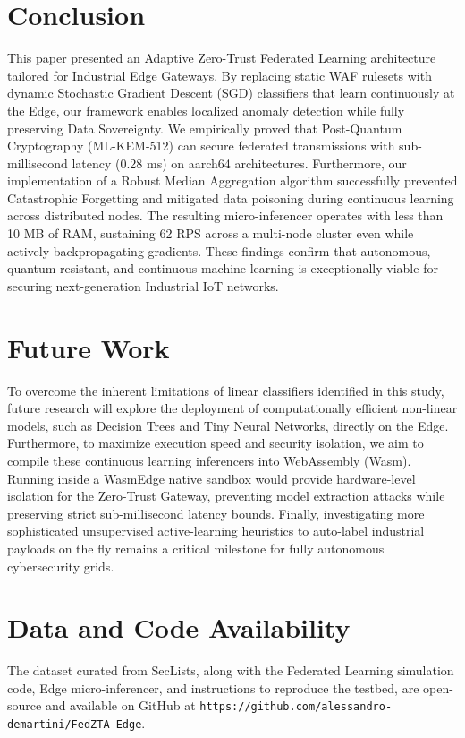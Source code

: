 \documentclass[conference]{IEEEtran}
\begin{document}
\section{Conclusion}
This paper presented an Adaptive Zero-Trust Federated Learning architecture tailored for Industrial Edge Gateways. By replacing static WAF rulesets with dynamic Stochastic Gradient Descent (SGD) classifiers that learn continuously at the Edge, our framework enables localized anomaly detection while fully preserving Data Sovereignty. We empirically proved that Post-Quantum Cryptography (ML-KEM-512) can secure federated transmissions with sub-millisecond latency (0.28 ms) on aarch64 architectures. Furthermore, our implementation of a Robust Median Aggregation algorithm successfully prevented Catastrophic Forgetting and mitigated data poisoning during continuous learning across distributed nodes. The resulting micro-inferencer operates with less than 10 MB of RAM, sustaining 62 RPS across a multi-node cluster even while actively backpropagating gradients. These findings confirm that autonomous, quantum-resistant, and continuous machine learning is exceptionally viable for securing next-generation Industrial IoT networks.

\section{Future Work}
To overcome the inherent limitations of linear classifiers identified in this study, future research will explore the deployment of computationally efficient non-linear models, such as Decision Trees and Tiny Neural Networks, directly on the Edge. Furthermore, to maximize execution speed and security isolation, we aim to compile these continuous learning inferencers into WebAssembly (Wasm). Running inside a WasmEdge native sandbox would provide hardware-level isolation for the Zero-Trust Gateway, preventing model extraction attacks while preserving strict sub-millisecond latency bounds. Finally, investigating more sophisticated unsupervised active-learning heuristics to auto-label industrial payloads on the fly remains a critical milestone for fully autonomous cybersecurity grids.

\section*{Data and Code Availability}
The dataset curated from SecLists, along with the Federated Learning simulation code, Edge micro-inferencer, and instructions to reproduce the testbed, are open-source and available on GitHub at \texttt{https://github.com/alessandro-demartini/FedZTA-Edge}.
\end{document}
